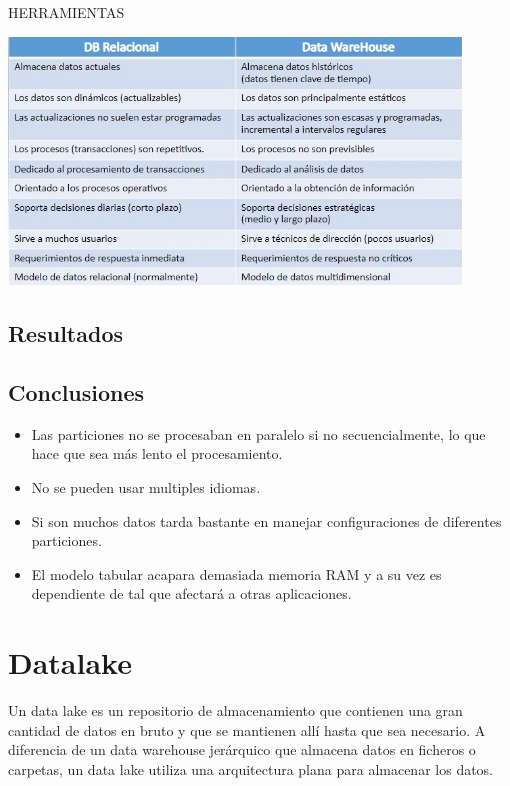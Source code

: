\documentclass[preprint,12pt]{elsarticle}
\begin{document}
HERRAMIENTAS\\
\begin{center}
	\includegraphics[width=12cm]{./Imagenes/imagen5} 
\end{center}

\subsection{Resultados}

\subsection{Conclusiones}

\begin{itemize}
	\item Las particiones no se procesaban en paralelo si no secuencialmente, lo que hace que sea más lento el procesamiento.
	\item No se pueden usar multiples idiomas.
	\item Si son muchos datos tarda bastante en manejar configuraciones de diferentes particiones.
	\item El modelo tabular acapara demasiada memoria RAM y a su vez es dependiente de tal que afectará a otras aplicaciones.
\end{itemize}

\section{Datalake}

Un data lake es un repositorio de almacenamiento que contienen una gran cantidad de datos en bruto y que se mantienen allí hasta que sea necesario. A diferencia de un data warehouse jerárquico que almacena datos en ficheros o carpetas, un data lake utiliza una arquitectura plana para almacenar los datos.\\
\end{document}
